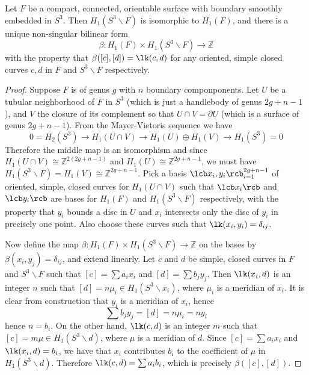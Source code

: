 \begin{lem}
Let $F$ be a compact, connected, orientable surface with boundary smoothly embedded in $S^3$. Then $H_1(S^3 \backslash F)$ is isomorphic to $H_1(F)$, and there is a unique non-singular bilinear form
\[ \beta : H_1(F) \times H_1(S^3 \backslash F) \rightarrow \mathbb Z \]
with the property that $\beta([c],[d])=\lk(c,d)$ for any oriented, simple closed curves $c,d$ in $F$ and $S^3\backslash F$ respectively.
\end{lem}
\begin{proof}
Suppose $F$ is of genus $g$ with $n$ boundary componponents. Let $U$ be a tubular neighborhood of $F$ in $S^3$ (which is just a handlebody of genus $2g+n-1$), and $V$ the closure of its complement so that $U \cap V = \partial U$ (which is a surface of genus $2g+n-1$). From the Mayer-Vietoris sequence we have
\[ 0 = H_2(S^3) \longrightarrow H_1(U \cap V) \longrightarrow H_1(U) \oplus H_1(V) \longrightarrow H_1(S^3) = 0 \]
Therefore the middle map is an isomorphism and since $H_1(U \cap V) \cong \mathbb Z^{2(2g+n-1)}$ and $H_1(U) \cong \mathbb Z^{2g+n-1}$, we must have $H_1(S^3 \backslash F) = H_1(V) \cong \mathbb Z^{2g+n-1}$. Pick a basis $\lcb x_i,y_i \rcb_{i=1}^{2g+n-1}$ of oriented, simple, closed curves for $H_1(U \cap V)$ such that $\lcb x_i \rcb$ and $\lcb y_i \rcb$ are bases for $H_1(F)$ and $H_1(S^3 \backslash F)$ respectively, with the property that $y_i$ bounds a disc in $U$ and $x_i$ intersects only the disc of $y_i$ in precisely one point. Also choose these curves such that $\lk(x_i,y_i)=\delta_{ij}$.

Now define the map $\beta : H_1(F) \times H_1(S^3 \backslash F) \rightarrow \mathbb Z$ on the bases by $\beta(x_i,y_j) = \delta_{ij}$, and extend linearly. Let $c$ and $d$ be simple, closed curves in $F$ and $S^3 \backslash F$ such that $[c] = \sum a_i x_i$ and $[d] = \sum b_j y_j$. Then $\lk(x_i,d)$ is an integer $n$ such that $[d] = n \mu_i \in H_1(S^3 \backslash x_i)$, where $\mu_i$ is a meridian of $x_i$. It is clear from construction that $y_i$ is a meridian of $x_i$, hence 
\[ \sum b_j y_j = [d] = n \mu_i = n y_i \]
hence $n = b_i$. On the other hand, $\lk(c,d)$ is an integer $m$ such that $[c] = m \mu \in H_1(S^3 \backslash d)$, where $\mu$ is a meridian of $d$. Since $[c] = \sum a_i x_i$ and $\lk(x_i,d) = b_i$, we have that $x_i$ contributes $b_i$ to the coefficient of $\mu$ in $H_1(S^3 \backslash d)$. Therefore $\lk(c,d) = \sum a_i b_i$, which is precisely $\beta([c],[d])$.
\end{proof}

